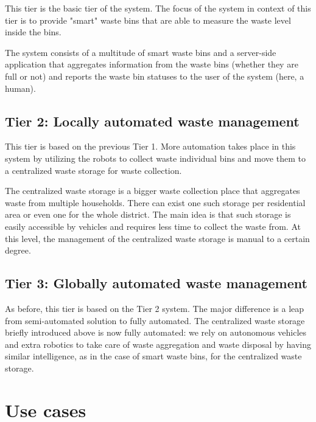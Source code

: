 \documentclass{article}
\begin{document}
This tier is the basic tier of the system. The focus of the system in context of this tier is to
provide "smart" waste bins that are able to measure the waste level inside the bins.

The system consists of a multitude of smart waste bins and a server-side application that aggregates
information from the waste bins (whether they are full or not) and reports the waste bin statuses to
the user of the system (here, a human).

\subsection{Tier 2: Locally automated waste management}

This tier is based on the previous Tier 1. More automation takes place in this system by utilizing
the robots to collect waste individual bins and move them to a centralized waste storage for waste
collection.

The centralized waste storage is a bigger waste collection place that aggregates waste from multiple
households. There can exist one such storage per residential area or even one for the whole
district. The main idea is that such storage is easily accessible by vehicles and requires less time
to collect the waste from. At this level, the management of the centralized waste storage is manual
to a certain degree.

\subsection{Tier 3: Globally automated waste management}

As before, this tier is based on the Tier 2 system. The major difference is a leap from
semi-automated solution to fully automated. The centralized waste storage briefly introduced above
is now fully automated: we rely on autonomous vehicles and extra robotics to take care of waste
aggregation and waste disposal by having similar intelligence, as in the case of smart waste bins,
for the centralized waste storage.

\section{Use cases}

\end{document}
